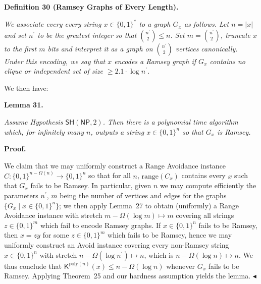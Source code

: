 

\par\medskip\noindent\textbf{
\textbf{Definition 30}\textbf{ }(Ramsey Graphs of Every Length)\textbf{.}
}\par



\emph{We associate every every string $x\in\{0,1\}^{*}$ to a graph $G_{x}$ as follows. Let $n=|x|$ and set $n^{\prime}$ to be the greatest integer so that $\binom{n^{\prime}}{2}\leq n$. Set $m=\binom{n^{\prime}}{2}$, truncate $x$ to the first $m$ bits and interpret it as a graph on $\binom{n^{\prime}}{2}$ vertices canonically. Under this encoding, we say that $x$ encodes a Ramsey graph if $G_{x}$ contains no clique or independent set of size $\geq 2.1\cdot\log n^{\prime}$.}\par






We then have:\par





\par\medskip\noindent\textbf{
\textbf{Lemma 31}\textbf{.}
}\par



\emph{Assume Hypothesis $\mathsf{SH}({\mathsf{NP}},2)$. Then there is a polynomial time algorithm which, for infinitely many $n$, outputs a string $x\in\{0,1\}^{n}$ so that $G_{x}$ is Ramsey.}\par







\par\medskip\noindent\textbf{Proof.}\par




We claim that we may uniformly construct a Range Avoidance instance $C:\{0,1\}^{n-\Omega(n)}\to\{0,1\}^{n}$ so that for all $n$, $\mathrm{range}(C_{x})$ contains every $x$ such that $G_{x}$ fails to be Ramsey. In particular, given $n$ we may compute efficiently the parameters $n^{\prime}$, $m$ being the number of vertices and edges for the graphs $\{G_{x}\mid x\in\{0,1\}^{n}\}$; we then apply Lemma 27 to obtain (uniformly) a Range Avoidance instance with stretch $m-\Omega(\log m)\mapsto m$ covering all strings $z\in\{0,1\}^{m}$ which fail to encode Ramsey graphs. If $x\in\{0,1\}^{n}$ fails to be Ramsey, then $x=zy$ for some $z\in\{0,1\}^{m}$ which fails to be Ramsey, hence we may uniformly construct an Avoid instance covering every non-Ramsey string $x\in\{0,1\}^{n}$ with stretch $n-\Omega(\log n^{\prime})\mapsto n$, which is $n-\Omega(\log n)\mapsto n$.
We thus conclude that ${\mathsf{K}}^{\mathrm{poly}(n)}(x)\leq n-\Omega(\log n)$ whenever $G_{x}$ fails to be Ramsey. Applying Theorem 25 and our hardness assumption yields the lemma.
$\blacktriangleleft$\par






